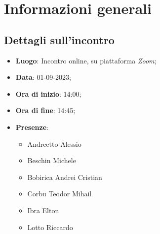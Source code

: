 \section{Informazioni generali}

\subsection{Dettagli sull'incontro}
\begin{itemize}
\item \textbf{Luogo}: Incontro online, su piattaforma \textit{Zoom\glo};
\item \textbf{Data}: 01-09-2023;
\item \textbf{Ora di inizio}: 14:00;
\item \textbf{Ora di fine}: 14:45;
\item \textbf{Presenze}: 
\begin{itemize}
	\item Andreetto Alessio
    \item Beschin Michele
    \item Bobirica Andrei Cristian
    \item Corbu Teodor Mihail
    \item Ibra Elton
    \item Lotto Riccardo 
\end{itemize}
\end{itemize}


